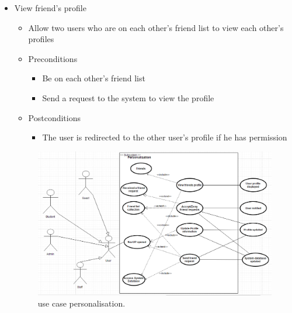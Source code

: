 \documentclass[12pt]{article}
\begin{document}
\begin{enumerate}
\begin{itemize}
				\item View friend’s profile
				\begin{itemize}
					\item Allow two users who are on each other’s friend list to view each other’s profiles
					\item Preconditions
					\begin{itemize}
						\item Be on each other’s friend list
						\item Send a request to the system to view the profile
					\end{itemize}
					\item Postconditions
					\begin{itemize}
						\item The user is redirected to the other user’s profile if he has permission
					\end{itemize}
				\end{itemize}
				\begin{figure}
				    \includegraphics[width=\linewidth]{useCasePersonalisation.png}
				    \caption{use case personalisation.}
  \label{fig:boat1}
				\end{figure}
			\end{itemize}
			
		  
		\end{enumerate}
			
\end{document}
